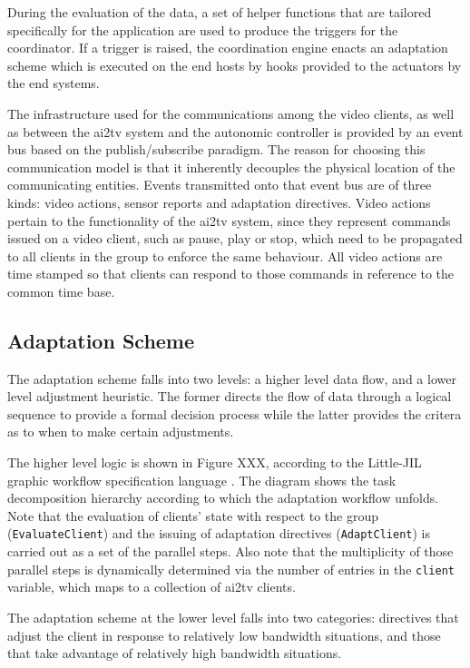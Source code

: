 \documentclass{sig-alternate}
\begin{document}
During the evaluation of the data, a set of helper functions that are
tailored specifically for the application are used to produce the
triggers for the coordinator.  If a trigger is raised, the
coordination engine enacts an adaptation scheme which is executed on
the end hosts by hooks provided to the actuators by the end systems.

The infrastructure used for the communications among the video
clients, as well as between the ai2tv system and the autonomic
controller is provided by an event bus based on the publish/subscribe
paradigm.  The reason for choosing this communication model is that it
inherently decouples the physical location of the communicating
entities.  Events transmitted onto that event bus are of three kinds:
video actions, sensor reports and adaptation directives.  Video
actions pertain to the functionality of the ai2tv system, since they
represent commands issued on a video client, such as pause, play or
stop, which need to be propagated to all clients in the group to
enforce the same behaviour.  All video actions are time stamped so
that clients can respond to those commands in reference to the common
time base.

\subsection{Adaptation Scheme}

The adaptation scheme falls into two levels: a higher level data flow,
and a lower level adjustment heuristic.  The former directs the flow
of data through a logical sequence to provide a formal decision
process while the latter provides the critera as to when to make
certain adjustments.

The higher level logic is shown in Figure XXX, according to the
Little-JIL graphic workflow specification language \cite{L-JIL}.  The
diagram shows the task decomposition hierarchy according to which the
adaptation workflow unfolds.  Note that the evaluation of clients'
state with respect to the group (\texttt{EvaluateClient}) and the
issuing of adaptation directives (\texttt{AdaptClient}) is carried out
as a set of the parallel steps.  Also note that the multiplicity of
those parallel steps is dynamically determined via the number of
entries in the \texttt{client} variable, which maps to a collection of
ai2tv clients.

%
%

The adaptation scheme at the lower level falls into two categories:
directives that adjust the client in response to relatively low
bandwidth situations, and those that take advantage of relatively high
bandwidth situations.
\end{document}
